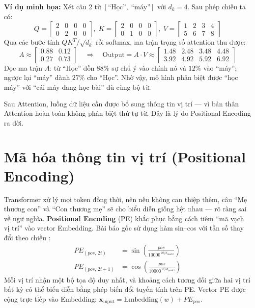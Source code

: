 \documentclass[a4paper,12pt,twoside]{report}
\begin{document}
\textbf{Ví dụ minh họa:} Xét câu 2 từ $[\text{``Học''},\; \text{``máy''}]$ với $d_k = 4$. Sau phép chiếu ta có:
$$
Q = \begin{bmatrix} 2 & 0 & 0 & 0 \\ 0 & 2 & 0 & 0 \end{bmatrix},\;
K = \begin{bmatrix} 2 & 0 & 0 & 0 \\ 0 & 1 & 0 & 0 \end{bmatrix},\;
V = \begin{bmatrix} 1 & 2 & 3 & 4 \\ 5 & 6 & 7 & 8 \end{bmatrix}
$$
Qua các bước tính $QK^T / \sqrt{d_k}$ rồi softmax, ma trận trọng số attention thu được:
$$
A \approx \begin{bmatrix} 0.88 & 0.12 \\ 0.27 & 0.73 \end{bmatrix}
\quad \Rightarrow \quad
\text{Output} = A \cdot V \approx \begin{bmatrix} 1.48 & 2.48 & 3.48 & 4.48 \\ 3.92 & 4.92 & 5.92 & 6.92 \end{bmatrix}
$$
Đọc ma trận $A$: từ ``Học'' dồn $88\%$ sự chú ý vào chính nó và $12\%$ vào ``máy''; ngược lại ``máy'' dành $27\%$ cho ``Học''. Nhờ vậy, mô hình phân biệt được ``học máy'' với ``cái máy đang học bài'' dù cùng bộ từ.

Sau Attention, luồng dữ liệu cần được bổ sung thông tin vị trí --- vì bản thân Attention hoàn toàn không phân biệt thứ tự từ. Đây là lý do Positional Encoding ra đời.

\section{Mã hóa thông tin vị trí (Positional Encoding)}
Transformer xử lý mọi token đồng thời, nên nếu không can thiệp thêm, câu ``Mẹ thương con'' và ``Con thương mẹ'' sẽ cho biểu diễn giống hệt nhau --- rõ ràng sai về ngữ nghĩa. \textbf{Positional Encoding} (PE) khắc phục bằng cách tiêm ``mã vạch vị trí'' vào vector Embedding. Bài báo gốc sử dụng hàm sin--cos với tần số thay đổi theo chiều \cite{vaswani2017attention}:
\begin{align}
    PE_{(pos,\, 2i)}   &= \sin\!\left(\frac{pos}{10000^{\,2i/d_{\text{model}}}}\right) \\
    PE_{(pos,\, 2i+1)} &= \cos\!\left(\frac{pos}{10000^{\,2i/d_{\text{model}}}}\right)
\end{align}
Mỗi vị trí nhận một bộ tọa độ duy nhất, và khoảng cách tương đối giữa hai vị trí bất kỳ có thể biểu diễn bằng phép biến đổi tuyến tính trên PE. Vector PE được cộng trực tiếp vào Embedding: $\mathbf{x}_{\text{input}} = \text{Embedding}(w) + PE_{pos}$.
\end{document}
